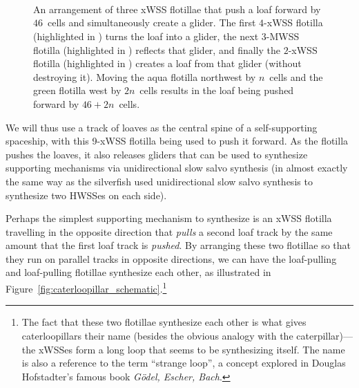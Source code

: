 \begin{figure}[!htb]
	\centering
	 \\[1em]
	
	 \\[1em]
	
	 \\[1em]
	
	
	\caption{An arrangement of three xWSS flotillae that push a loaf forward by $46$~cells and simultaneously create a glider. The first $4$-xWSS flotilla (highlighted in ) turns the loaf into a glider, the next $3$-MWSS flotilla (highlighted in ) reflects that glider, and finally the $2$-xWSS flotilla (highlighted in ) creates a loaf from that glider (without destroying it). Moving the aqua flotilla northwest by $n$~cells and the green flotilla west by $2n$~cells results in the loaf being pushed forward by $46 + 2n$~cells.}\label{fig:caterloopillar_loaf_pusher}
\end{figure}

We will thus use a track of loaves as the central spine of a self-supporting spaceship, with this 9-xWSS flotilla being used to push it forward. As the flotilla pushes the loaves, it also releases gliders that can be used to synthesize supporting mechanisms via unidirectional slow salvo synthesis (in almost exactly the same way as the silverfish used unidirectional slow salvo synthesis to synthesize two HWSSes on each side).

Perhaps the simplest supporting mechanism to synthesize is an xWSS flotilla travelling in the opposite direction that \emph{pulls} a second loaf track by the same amount that the first loaf track is \emph{pushed}. By arranging these two flotillae so that they run on parallel tracks in opposite directions, we can have the loaf-pulling and loaf-pulling flotillae synthesize each other, as illustrated in Figure~\ref{fig:caterloopillar_schematic}.\footnote{The fact that these two flotillae synthesize each other is what gives caterloopillars their name (besides the obvious analogy with the caterpillar)---the xWSSes form a long loop that seems to be synthesizing itself. The name is also a reference to the term ``strange loop'', a concept explored in Douglas Hofstadter's famous book \emph{G\"{o}del, Escher, Bach}.}

